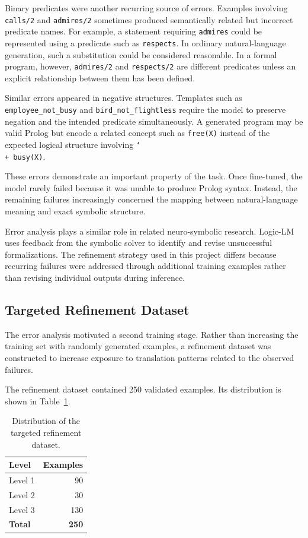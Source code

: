 \documentclass[11pt]{article} %
\theoremstyle{plain}
\theoremstyle{definition}
\begin{document}
Binary predicates were another recurring source of errors. Examples involving
\texttt{calls/2} and \texttt{admires/2} sometimes produced semantically related
but incorrect predicate names. For example, a statement requiring
\texttt{admires} could be represented using a predicate such as
\texttt{respects}. In ordinary natural-language generation, such a substitution
could be considered reasonable. In a formal program, however,
\texttt{admires/2} and \texttt{respects/2} are different predicates unless an
explicit relationship between them has been defined.

Similar errors appeared in negative structures. Templates such as
\texttt{employee\_not\_busy} and \texttt{bird\_not\_flightless} require the
model to preserve negation and the intended predicate simultaneously. A
generated program may be valid Prolog but encode a related concept such as
\texttt{free(X)} instead of the expected logical structure involving
\texttt{\char`\\+ busy(X)}.

These errors demonstrate an important property of the task. Once fine-tuned,
the model rarely failed because it was unable to produce Prolog syntax.
Instead, the remaining failures increasingly concerned the mapping between
natural-language meaning and exact symbolic structure.

Error analysis plays a similar role in related neuro-symbolic research.
Logic-LM uses feedback from the symbolic solver to identify and revise
unsuccessful formalizations. The refinement strategy used in this project
differs because recurring failures were addressed through additional training
examples rather than revising individual outputs during inference.


\subsection{Targeted Refinement Dataset}

The error analysis motivated a second training stage. Rather than increasing
the training set with randomly generated examples, a refinement dataset was
constructed to increase exposure to translation patterns related to the
observed failures.

The refinement dataset contained 250 validated examples. Its distribution is
shown in Table~\ref{tab:refinement-distribution}.

\begin{table}[ht]
\centering
\caption{Distribution of the targeted refinement dataset.}
\label{tab:refinement-distribution}
\begin{tabular}{lr}
\toprule
\textbf{Level} & \textbf{Examples} \\
\midrule
Level 1 & 90  \\
Level 2 & 30  \\
Level 3 & 130 \\
\midrule
\textbf{Total} & \textbf{250} \\
\bottomrule
\end{tabular}
\end{table}
\end{document}
